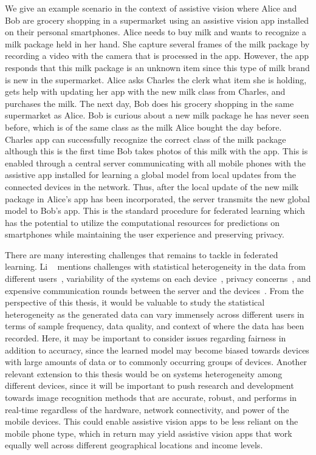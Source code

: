 We give an example scenario in the context of assistive vision where Alice and Bob are grocery shopping in a supermarket using an assistive vision app installed on their personal smartphones. Alice needs to buy milk and wants to recognize a milk package held in her hand. She capture several frames of the milk package by recording a video with the camera that is processed in the app. However, the app responds that this milk package is an unknown item since this type of milk brand is new in the supermarket. Alice asks Charles the clerk what item she is holding, gets help with updating her app with the new milk class from Charles, and purchases the milk. The next day, Bob does his grocery shopping in the same supermarket as Alice. Bob is curious about a new milk package he has never seen before, which is of the same class as the milk Alice bought the day before. Charles app can successfully recognize the correct class of the milk package although this is the first time Bob takes photos of this milk with the app. This is enabled through a central server communicating with all mobile phones with the assistive app installed for learning a global model from local updates from the connected devices in the network. Thus, after the local update of the new milk package in Alice's app has been incorporated, the server transmits the new global model to Bob's app. This is the standard procedure for federated learning which has the potential to utilize the computational resources for predictions on smartphones while maintaining the user experience and preserving privacy. 

There are many interesting challenges that remains to tackle in federated learning. Li \etal~\cite{li2020federated} mentions challenges with statistical heterogeneity in the data from different users~\cite{smith2017federated, zhao2018federated, li2020federated}, variability of the systems on each device~\cite{bonawitz2019towards}, privacy concerns~\cite{geyer2017differentially, bhowmick2018protection}, and expensive communication rounds between the server and the devices~\cite{konevcny2016federated}. From the perspective of this thesis, it would be valuable to study the statistical heterogeneity as the generated data can vary immensely across different users in terms of sample frequency, data quality, and context of where the data has been recorded. Here, it may be important to consider issues regarding fairness in addition to accuracy, since the learned model may become biased towards devices with large amounts of data or to commonly occurring groups of devices. Another relevant extension to this thesis would be on systems heterogeneity among different devices, since it will be important to push research and development towards image recognition methods that are accurate, robust, and performs in real-time regardless of the hardware, network connectivity, and power of the mobile devices. This could enable assistive vision apps to be less reliant on the mobile phone type, which in return may yield assistive vision apps that work equally well across different geographical locations and income levels. 



